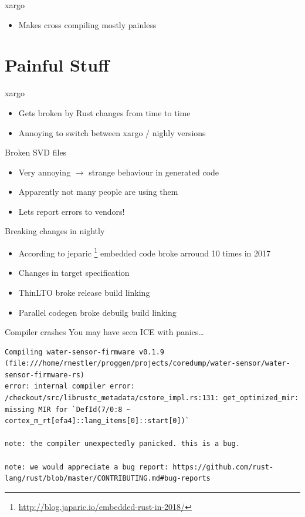 \documentclass[aspectratio=1610,14pt,t]{beamer}
\begin{document}
\begin{frame}[c]{xargo}
  \begin{itemize}
    \item Makes cross compiling mostly painless
  \end{itemize}
\end{frame}

\section{Painful Stuff}

\begin{frame}[c]{xargo}
  \begin{itemize}
    \item Gets broken by Rust changes from time to time
    \item Annoying to switch between xargo / nighly versions
  \end{itemize}
\end{frame}

\begin{frame}[c]{Broken SVD files}
  \begin{itemize}
    \item Very annoying $\rightarrow$ strange behaviour in generated code
    \item Apparently not many people are using them
    \item Lets report errors to vendors!
  \end{itemize}
\end{frame}

\begin{frame}[c]{Breaking changes in nightly}
  \begin{itemize}
    \item According to jeparic
      \footnote{\url{http://blog.japaric.io/embedded-rust-in-2018/}} embedded
      code broke arround 10 times in 2017
    \item Changes in target specification
    \item ThinLTO broke release build linking
    \item Parallel codegen broke debuilg build linking
  \end{itemize}
\end{frame}

\begin{frame}[c,fragile]{Compiler crashes}
  You may have seen ICE with panics\ldots

  \begin{verbatim}
Compiling water-sensor-firmware v0.1.9 (file:///home/rnestler/proggen/projects/coredump/water-sensor/water-sensor-firmware-rs)
error: internal compiler error: /checkout/src/librustc_metadata/cstore_impl.rs:131: get_optimized_mir: missing MIR for `DefId(7/0:8 ~ cortex_m_rt[efa4]::lang_items[0]::start[0])`

note: the compiler unexpectedly panicked. this is a bug.

note: we would appreciate a bug report: https://github.com/rust-lang/rust/blob/master/CONTRIBUTING.md#bug-reports
  \end{verbatim}
\end{frame}
\end{document}
